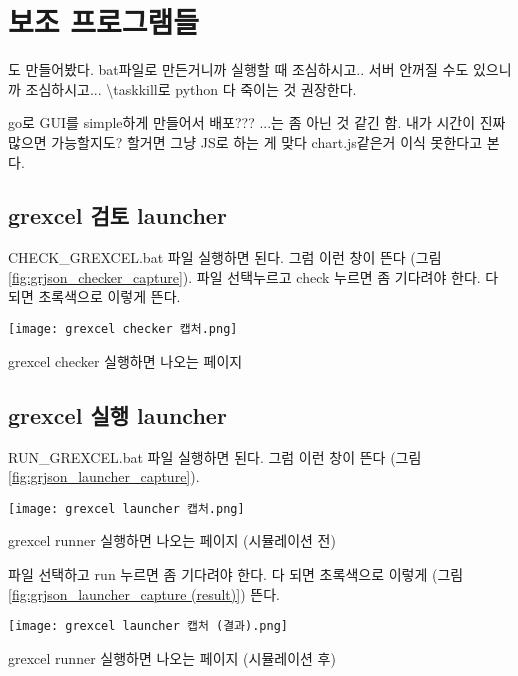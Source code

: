 
\section{보조 프로그램들}
도 만들어봤다.
bat파일로 만든거니까 실행할 때 조심하시고.. 서버 안꺼질 수도 있으니까 조심하시고... \textbackslash taskkill로 python 다 죽이는 것 권장한다. \par
go로 GUI를 simple하게 만들어서 배포??? ...는 좀 아닌 것 같긴 함. 내가 시간이 진짜 많으면 가능할지도? 할거면 그냥 JS로 하는 게 맞다 chart.js같은거 이식 못한다고 본다.

\subsection{grexcel 검토 launcher}
CHECK\_GREXCEL.bat 파일 실행하면 된다. 그럼 이런 창이 뜬다 (그림 \ref{fig:grjson_checker_capture}).
파일 선택누르고 check 누르면 좀 기다려야 한다. 다 되면 초록색으로 이렇게 뜬다.

\begin{defaultfigure}
  \texttt{[image: grexcel checker 캡처.png]}
  \caption{grexcel checker 실행하면 나오는 페이지}
  \label{fig:grjson_checker_capture}
\end{defaultfigure}

\subsection{grexcel 실행 launcher}
RUN\_GREXCEL.bat 파일 실행하면 된다. 그럼 이런 창이 뜬다 (그림 \ref{fig:grjson_launcher_capture}).

\begin{defaultfigure}
  \texttt{[image: grexcel launcher 캡처.png]}
  \caption{grexcel runner 실행하면 나오는 페이지 (시뮬레이션 전)}
  \label{fig:grjson_launcher_capture}
\end{defaultfigure}

파일 선택하고 run 누르면 좀 기다려야 한다. 다 되면 초록색으로 이렇게 (그림 \ref{fig:grjson_launcher_capture (result)}) 뜬다.

\begin{defaultfigure}
  \texttt{[image: grexcel launcher 캡처 (결과).png]}
  \caption{grexcel runner 실행하면 나오는 페이지 (시뮬레이션 후)}
  \label{fig:grjson_launcher_capture (result)}
\end{defaultfigure}

